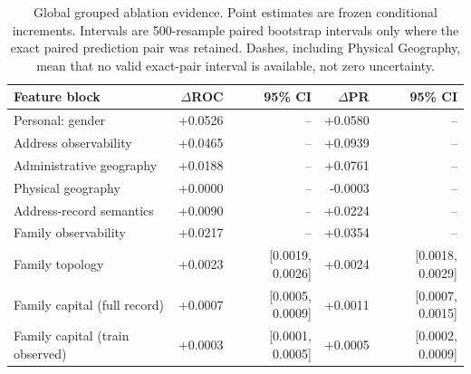 \begin{table}[t]
\caption{Global grouped ablation evidence. Point estimates are frozen conditional increments. Intervals are 500-resample paired bootstrap intervals only where the exact paired prediction pair was retained. Dashes, including Physical Geography, mean that no valid exact-pair interval is available, not zero uncertainty.}
\label{tab:ablation}
\centering
\begin{tabular}{lrrrr}
\toprule
Feature block & $\Delta$ROC & 95\% CI & $\Delta$PR & 95\% CI \\
\midrule
Personal: gender & +0.0526 & -- & +0.0580 & -- \\
Address observability & +0.0465 & -- & +0.0939 & -- \\
Administrative geography & +0.0188 & -- & +0.0761 & -- \\
Physical geography & +0.0000 & -- & -0.0003 & -- \\
Address-record semantics & +0.0090 & -- & +0.0224 & -- \\
Family observability & +0.0217 & -- & +0.0354 & -- \\
Family topology & +0.0023 & [0.0019, 0.0026] & +0.0024 & [0.0018, 0.0029] \\
Family capital (full record) & +0.0007 & [0.0005, 0.0009] & +0.0011 & [0.0007, 0.0015] \\
Family capital (train observed) & +0.0003 & [0.0001, 0.0005] & +0.0005 & [0.0002, 0.0009] \\
\bottomrule
\end{tabular}
\end{table}
